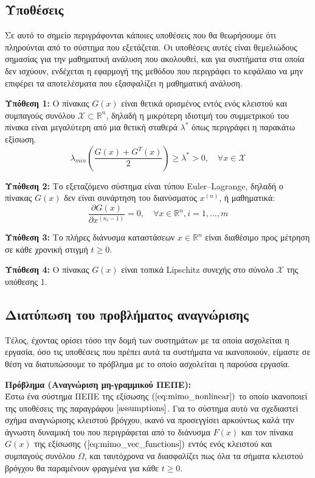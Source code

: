 \subsection{Υποθέσεις} \label{assumptions}
Σε αυτό το σημείο περιγράφονται κάποιες υποθέσεις που θα θεωρήσουμε ότι πληρούνται από το σύστημα που εξετάζεται. Οι υποθέσεις αυτές είναι θεμελιώδους σημασίας για την μαθηματική ανάλυση που ακολουθεί, και για συστήματα στα οποία δεν ισχύουν, ενδέχεται η εφαρμογή της μεθόδου που περιγράφει το κεφάλαιο να μην επιφέρει τα αποτελέσματα που εξασφαλίζει η μαθηματική ανάλυση.

\textbf{Υπόθεση 1:} Ο πίνακας $G(x)$ είναι θετικά ορισμένος εντός ενός κλειστού και συμπαγούς συνόλου $\mathcal{X} \subset \mathbb{R}^n$, δηλαδή η μικρότερη ιδιοτιμή του συμμετρικού του πίνακα είναι μεγαλύτερη από μια θετική σταθερά $\lambda^*$ όπως περιγράφει η παρακάτω εξίσωση.
\begin{equation}
	\lambda_{min} \left(\frac{G(x) + G^T (x)}{2}\right) \geq \lambda^* > 0
	,\quad \forall x \in \mathcal{X}
	\label{eq:assump_1}
\end{equation}

\textbf{Υπόθεση 2:} Το εξεταζόμενο σύστημα είναι τύπου Euler–Lagrange, δηλαδή ο πίνακας $G(x)$ δεν είναι συνάρτηση του διανύσματος $x^{(n)}$, ή μαθηματικά:
\begin{equation}
	\frac{\partial G(x)}{\partial x^{(n_i-1)}} = 0, \quad \forall x \in \mathbb{R}^n, i = 1,\dots,m
	\label{eq:assump_2}
\end{equation}

\textbf{Υπόθεση 3:} Το πλήρες διάνυσμα καταστάσεων $x \in \mathbb{R}^n$ είναι διαθέσιμο προς μέτρηση σε κάθε χρονική στιγμή $t \geq 0$.

\textbf{Υπόθεση 4:} Ο πίνακας $G(x)$ είναι τοπικά Lipschitz συνεχής στο σύνολο $\mathcal{X}$ της υπόθεσης 1.

\subsection{Διατύπωση του προβλήματος αναγνώρισης} \label{subsec:problem_definition}
Τέλος, έχοντας ορίσει τόσο την δομή των συστημάτων με τα οποία ασχολείται η εργασία, όσο τις υποθέσεις που πρέπει αυτά τα συστήματα να ικανοποιούν, είμαστε σε θέση να διατυπώσουμε το πρόβλημα με το οποίο ασχολείται η παρούσα εργασία.

\textbf{Πρόβλημα (Αναγνώριση μη-γραμμικού ΠΕΠΕ):}\\
Έστω ένα σύστημα ΠΕΠΕ της εξίσωσης $(\ref{eq:mimo_nonlinear})$ το οποίο ικανοποιεί της υποθέσεις της παραγράφου $\ref{assumptions}$. Για το σύστημα αυτό να σχεδιαστεί σχήμα αναγνώρισης κλειστού βρόγχου, ικανό να προσεγγίσει αρκούντως καλά την άγνωστη δυναμική του που περιγράφεται από το διάνυσμα $F(x)$ και τον πίνακα $G(x)$ της εξίσωσης $(\ref{eq:mimo_vec_functions})$ εντός ενός κλειστού και συμπαγούς συνόλου $\Omega$, και ταυτόχρονα να διασφαλίζει πως όλα τα σήματα κλειστού βρόγχου θα παραμένουν φραγμένα για κάθε $t \geq 0$.

